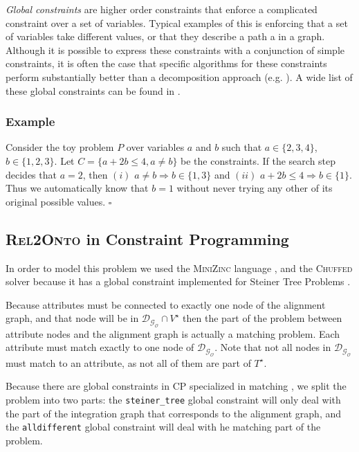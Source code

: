 \documentclass[letterpaper]{article} %
\newcommand{\minizinc}{\textsc{MiniZinc}}
\newcommand{\chuffed}{\textsc{Chuffed}}
\newcommand{\relonto}{\textsc{Rel2Onto}}
\begin{document}
\emph{Global constraints} are higher order constraints that enforce a 
complicated 
constraint over a set of variables. Typical examples of this is enforcing that 
a set of variables take different values, or that they describe a path a in a 
graph. Although it is possible to express these constraints with a conjunction 
of simple constraints, it is often the case that specific algorithms for these 
constraints perform substantially better than a decomposition approach (e.g. 
\cite{regin1994filtering}). A wide 
list of these global constraints can be found in \cite{beldiceanu2012global}.

\subsubsection{Example} Consider the toy problem $P$ over variables $a$ and $b$ 
such that $a \in \{2,3,4\}$, $b \in \{1,2,3\}$. Let $C = \{a + 2b \leq 4, a 
\neq b\}$ be the constraints. If the search step decides that $a = 
2$, then $(i)$ $a \neq b \Rightarrow b \in \{1,3\}$ and $(ii)$ $a + 2b \leq 4  
\Rightarrow b \in \{1\}$. Thus we automatically know that $b = 1$ without never 
trying any other of its original possible values. $\square$


\subsection{\relonto{} in Constraint Programming}
In order to model this problem we used the \minizinc{} language 
\cite{minizinc}, and the 
\chuffed{} solver \cite{chu2011improving} because it has a global constraint 
implemented for Steiner 
Tree Problems \cite{deuna2016steiner}. 

Because attributes must be connected to exactly one node of the alignment 
graph, and that node will be in $\mathcal{D_{G_O}} \cap V^\star$ 
then the part of the problem between attribute nodes and the alignment graph is 
actually a matching problem. Each attribute must match exactly to one node of 
$\mathcal{D_{G_O}}$. Note that not all nodes in $\mathcal{D_{G_O}}$ must match 
to an attribute, as not all of them are part of $T^\star$.

Because there are global constraints in CP specialized in matching 
\cite{regin1994filtering}, we split the problem into two parts: the 
\verb|steiner_tree| global constraint will only deal with the part of the 
integration graph that corresponds to the alignment graph, and the 
\verb|alldifferent| global constraint will deal with he matching part of the 
problem.
\end{document}
